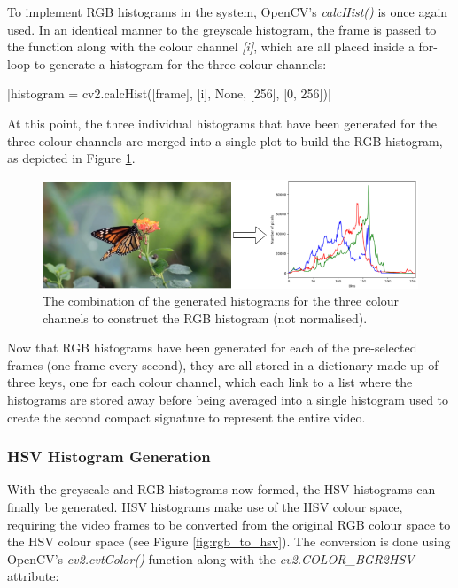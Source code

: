 To implement RGB histograms in the system, OpenCV's \textit{calcHist()} is once again used. In an identical manner to the greyscale histogram, the frame is passed to the function along with the colour channel \textit{[i]}, which are all placed inside a for-loop to generate a histogram for the three colour channels:

|histogram = cv2.calcHist([frame], [i], None, [256], [0, 256])|

At this point, the three individual histograms that have been generated for the three colour channels are merged into a single plot to build the RGB histogram, as depicted in Figure \ref{fig:implementation-rgb_not_normalised}.

\begin{figure}[h] 
\centerline{\includegraphics[width=\textwidth]{figures/implementation/rgb_not_normalised.png}}
\caption{\label{fig:implementation-rgb_not_normalised}The combination of the generated histograms for the three colour channels to construct the RGB histogram (not normalised).}
\end{figure}

Now that RGB histograms have been generated for each of the pre-selected frames (one frame every second), they are all stored in a dictionary made up of three keys, one for each colour channel, which each link to a list where the histograms are stored away before being averaged into a single histogram used to create the second compact signature to represent the entire video. 


\subsubsection{HSV Histogram Generation}

With the greyscale and RGB histograms now formed, the HSV histograms can finally be generated. HSV histograms make use of the HSV colour space, requiring the video frames to be converted from the original RGB colour space to the HSV colour space (see Figure \ref{fig:rgb_to_hsv}). The conversion is done using OpenCV's \textit{cv2.cvtColor()} function along with the \textit{cv2.COLOR\_BGR2HSV} attribute:

